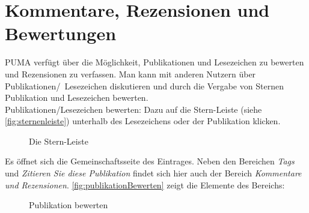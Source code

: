 \section{Kommentare, Rezensionen und Bewertungen}
\label{sec:kommentare}
PUMA verfügt über die Möglichkeit, Publikationen und Lesezeichen zu bewerten und Rezensionen zu verfassen. Man kann mit anderen Nutzern über Publikationen/~Lesezeichen diskutieren und durch die Vergabe von Sternen Publikation und Lesezeichen bewerten.\\
Publikationen/Lesezeichen bewerten:
Dazu auf die Stern-Leiste (siehe \autoref{fig:sternenleiste}) unterhalb des Lesezeichens oder der Publikation klicken.
\begin{figure}[h!]
 \centering
 \caption{Die Stern-Leiste}
 \label{fig:sternenleiste}
\end{figure}  
Es öffnet sich die Gemeinschaftsseite des Eintrages. Neben den Bereichen \textit{Tags} und \textit{Zitieren Sie diese Publikation} findet sich hier auch der Bereich \textit{Kommentare und Rezensionen}. \autoref{fig:publikationBewerten} zeigt die Elemente des Bereichs:
\begin{figure}[h!]
 \centering
 \caption{Publikation bewerten}
 \label{fig:publikationBewerten}
\end{figure}
